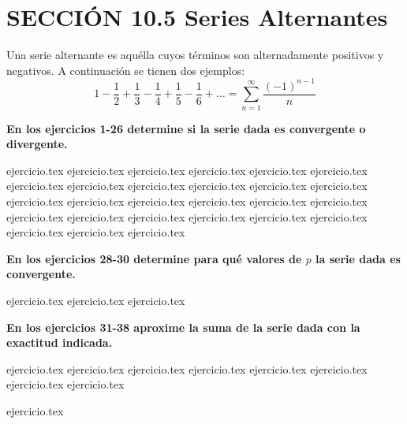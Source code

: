 
\section*{SECCIÓN 10.5 \quad Series Alternantes}

Una serie alternante es aquélla cuyos términos son alternadamente positivos y negativos. A continuación se tienen dos ejemplos:
\[ 1 - \frac{1}{2} + \frac{1}{3} - \frac{1}{4} + \frac{1}{5} - \frac{1}{6} + \dots = \sum_{n=1}^\infty \frac{(-1)^{n-1}}{n} \]

\vspace{0.5cm}
\noindent\textbf{En los ejercicios 1-26 determine si la serie dada es convergente o divergente.}
\begin{enumerate}
    {ejercicio.tex}
{ejercicio.tex}
{ejercicio.tex}
{ejercicio.tex}
{ejercicio.tex}
{ejercicio.tex}
{ejercicio.tex}
{ejercicio.tex}
{ejercicio.tex}
{ejercicio.tex}
{ejercicio.tex}
{ejercicio.tex}
{ejercicio.tex}
{ejercicio.tex}
{ejercicio.tex}
{ejercicio.tex}
{ejercicio.tex}
{ejercicio.tex}
{ejercicio.tex}
{ejercicio.tex}
{ejercicio.tex}
{ejercicio.tex}
{ejercicio.tex}
{ejercicio.tex}
{ejercicio.tex}
{ejercicio.tex}
{ejercicio.tex}
\end{enumerate}

\vspace{0.5cm}
\noindent\textbf{En los ejercicios 28-30 determine para qué valores de $p$ la serie dada es convergente.}
\begin{enumerate}
    \setcounter{enumi}{27}
    {ejercicio.tex}
{ejercicio.tex}
{ejercicio.tex}
\end{enumerate}

\vspace{0.5cm}
\noindent\textbf{En los ejercicios 31-38 aproxime la suma de la serie dada con la exactitud indicada.}
\begin{enumerate}
    \setcounter{enumi}{30}
    {ejercicio.tex}
{ejercicio.tex}
{ejercicio.tex}
{ejercicio.tex}
{ejercicio.tex}
{ejercicio.tex}
{ejercicio.tex}
{ejercicio.tex}
\end{enumerate}

\vspace{0.5cm}
\begin{enumerate}
    \setcounter{enumi}{38}
    {ejercicio.tex}
\end{enumerate}
